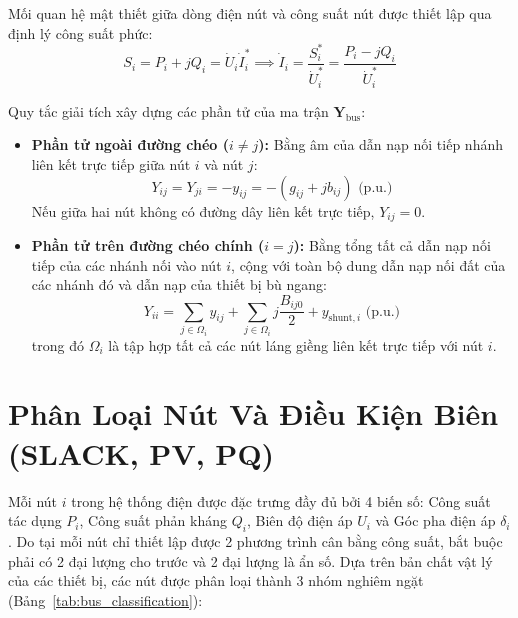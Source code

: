 \documentclass[12pt,a4paper,oneside]{report}
\begin{document}
\noindent Mối quan hệ mật thiết giữa dòng điện nút và công suất nút được thiết lập qua định lý công suất phức:
\begin{equation}
S_i = P_i + jQ_i = \dot{U}_i \dot{I}_i^* \implies \dot{I}_i = \frac{S_i^*}{\dot{U}_i^*} = \frac{P_i - jQ_i}{\dot{U}_i^*}
\end{equation}

\noindent Quy tắc giải tích xây dựng các phần tử của ma trận $\mathbf{Y}_{\text{bus}}$:
\begin{itemize}
    \item \textbf{Phần tử ngoài đường chéo ($i \ne j$):} Bằng âm của dẫn nạp nối tiếp nhánh liên kết trực tiếp giữa nút $i$ và nút $j$:
    \begin{equation}
    Y_{ij} = Y_{ji} = - y_{ij} = - (g_{ij} + j b_{ij})\text{ (p.u.)}
    \end{equation}
    Nếu giữa hai nút không có đường dây liên kết trực tiếp, $Y_{ij} = 0$.
    \item \textbf{Phần tử trên đường chéo chính ($i = j$):} Bằng tổng tất cả dẫn nạp nối tiếp của các nhánh nối vào nút $i$, cộng với toàn bộ dung dẫn nạp nối đất của các nhánh đó và dẫn nạp của thiết bị bù ngang:
    \begin{equation}
    Y_{ii} = \sum_{j \in \Omega_i} y_{ij} + \sum_{j \in \Omega_i} j \frac{B_{ij0}}{2} + y_{\text{shunt}, i}\text{ (p.u.)}
    \end{equation}
    trong đó $\Omega_i$ là tập hợp tất cả các nút láng giềng liên kết trực tiếp với nút $i$.
\end{itemize}

\section{Phân Loại Nút Và Điều Kiện Biên (SLACK, PV, PQ)}
Mỗi nút $i$ trong hệ thống điện được đặc trưng đầy đủ bởi 4 biến số: Công suất tác dụng $P_i$, Công suất phản kháng $Q_i$, Biên độ điện áp $U_i$ và Góc pha điện áp $\delta_i$. Do tại mỗi nút chỉ thiết lập được 2 phương trình cân bằng công suất, bắt buộc phải có 2 đại lượng cho trước và 2 đại lượng là ẩn số. Dựa trên bản chất vật lý của các thiết bị, các nút được phân loại thành 3 nhóm nghiêm ngặt (Bảng~\ref{tab:bus_classification}):
\end{document}
